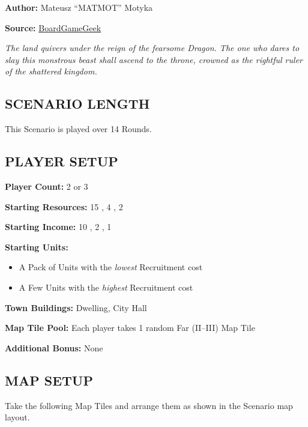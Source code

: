 
\begin{multicols*}{2}

\textbf{Author:} Mateusz ``MATMOT'' Motyka

\textbf{Source:} \href{https://boardgamegeek.com/filepage/277736/clash-scenario-the-hunt-v10}{BoardGameGeek}

\textit{The land quivers under the reign of the fearsome Dragon.
  The one who dares to slay this monstrous beast shall ascend to the throne, crowned as the rightful ruler of the shattered kingdom.
}

\subsection*{\MakeUppercase{Scenario Length}}
This Scenario is played over 14 Rounds.

\subsection*{\MakeUppercase{Player Setup}}
\textbf{Player Count:} 2 or 3

\textbf{Starting Resources:} 15 , 4 , 2 

\textbf{Starting Income:} 10 , 2 , 1 

\textbf{Starting Units:}
\begin{itemize}
  \item A Pack of  Units with the \textit{lowest} Recruitment cost
  \item A Few  Units with the \textit{highest} Recruitment cost
\end{itemize}

\textbf{Town Buildings:}  Dwelling, City Hall

\textbf{Map Tile Pool:} Each player takes 1 random Far (II--III) Map Tile

\textbf{Additional Bonus:} None

\subsection*{\MakeUppercase{Map Setup}}

Take the following Map Tiles and arrange them as shown in the Scenario map layout.


\end{multicols*}
